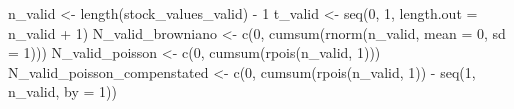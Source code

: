 \documentclass[
  letterpaper,
  DIV=11,
  numbers=noendperiod]{scrreprt}
\newenvironment{Shaded}{\begin{snugshade}}{\end{snugshade}}
\newcommand{\AttributeTok}[1]{\textcolor[rgb]{0.40,0.45,0.13}{#1}}
\newcommand{\DecValTok}[1]{\textcolor[rgb]{0.68,0.00,0.00}{#1}}
\newcommand{\FunctionTok}[1]{\textcolor[rgb]{0.28,0.35,0.67}{#1}}
\newcommand{\NormalTok}[1]{\textcolor[rgb]{0.00,0.23,0.31}{#1}}
\newcommand{\OtherTok}[1]{\textcolor[rgb]{0.00,0.23,0.31}{#1}}
\newcommand{\SpecialCharTok}[1]{\textcolor[rgb]{0.37,0.37,0.37}{#1}}
\begin{document}
\begin{Shaded}
\begin{Highlighting}[]
\NormalTok{n\_valid }\OtherTok{\textless{}{-}} \FunctionTok{length}\NormalTok{(stock\_values\_valid) }\SpecialCharTok{{-}} \DecValTok{1}
\NormalTok{t\_valid }\OtherTok{\textless{}{-}} \FunctionTok{seq}\NormalTok{(}\DecValTok{0}\NormalTok{, }\DecValTok{1}\NormalTok{, }\AttributeTok{length.out =}\NormalTok{ n\_valid }\SpecialCharTok{+} \DecValTok{1}\NormalTok{)}
\NormalTok{N\_valid\_browniano }\OtherTok{\textless{}{-}} \FunctionTok{c}\NormalTok{(}\DecValTok{0}\NormalTok{, }\FunctionTok{cumsum}\NormalTok{(}\FunctionTok{rnorm}\NormalTok{(n\_valid, }\AttributeTok{mean =} \DecValTok{0}\NormalTok{, }\AttributeTok{sd =} \DecValTok{1}\NormalTok{)))}
\NormalTok{N\_valid\_poisson }\OtherTok{\textless{}{-}} \FunctionTok{c}\NormalTok{(}\DecValTok{0}\NormalTok{, }\FunctionTok{cumsum}\NormalTok{(}\FunctionTok{rpois}\NormalTok{(n\_valid, }\DecValTok{1}\NormalTok{)))}
\NormalTok{N\_valid\_poisson\_compenstated }\OtherTok{\textless{}{-}} \FunctionTok{c}\NormalTok{(}\DecValTok{0}\NormalTok{, }\FunctionTok{cumsum}\NormalTok{(}\FunctionTok{rpois}\NormalTok{(n\_valid, }\DecValTok{1}\NormalTok{)) }\SpecialCharTok{{-}}
    \FunctionTok{seq}\NormalTok{(}\DecValTok{1}\NormalTok{, n\_valid, }\AttributeTok{by =} \DecValTok{1}\NormalTok{))}
\end{Highlighting}
\end{Shaded}
\end{document}

